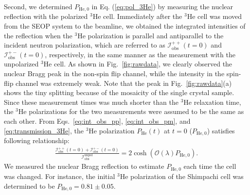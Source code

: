 \documentclass[%
 reprint,
superscriptaddress,
 amsmath,amssymb,
 aps,
floatfix,
]{revtex4-2}
\newcommand{\He}{$^3$He }
\begin{document}
    Second, we determined $P_\mathrm{He,0}$ in Eq. (\ref{eq:pol_3He}) by measuring the nuclear reflection with the polarized \He cell. 
    Immediately after the \He cell was moved from the SEOP system to the beamline, we obtained the integrated intensities of the reflection when the \He polarization is parallel and antiparallel to the incident neutron polarization, which are referred to as $\mathcal{I}^\mathrm{++}_\mathrm{obs}(t=0)$ and $\mathcal{I}^\mathrm{+-}_\mathrm{obs}(t=0)$, respectively, in the same manner as the measurement with the unpolarized \He cell. 
    As shown in Fig.~\ref{fig:rawdata}, we clearly observed the nuclear Bragg peak in the non-spin flip channel, while the intensity in the spin-flip channel was extremely weak. 
    Note that the peak in Fig.~\ref{fig:rawdata}(a) shows the tiny splitting because of the mosaicity of the single crystal sample.
    Since these measurement times was much shorter than the \He relaxation time, the \He polarizations for the two measurements were assumed to be the same as each other.
    From Eqs.~\ref{eq:int_obs_pp}, \ref{eq:int_obs_pm}, and \ref{eq:transmission_3He}, the \He polarization $P_\mathrm{He}(t)$ at $t=0$ ($P_\mathrm{He,0}$) satisfies following relationship:
    \begin{align}
        \frac{\mathcal{I}^{++}_\mathrm{obs}(t=0)+\mathcal{I}^{+-}_\mathrm{obs}(t=0)}{\mathcal{I}^\mathrm{unpol}_\mathrm{obs}} = 2\cosh(\mathcal{O}(\lambda)P_\mathrm{He,0}).
        \label{eq:transmission_ratio}
    \end{align}
    We measured the nuclear Bragg reflection to estimate $P_\mathrm{He,0}$ each time the cell was changed. 
    For instance, the initial \He polarization of the Shimpachi cell was determined to be $P_\mathrm{He,0}=0.81\pm0.05$.
\end{document}
